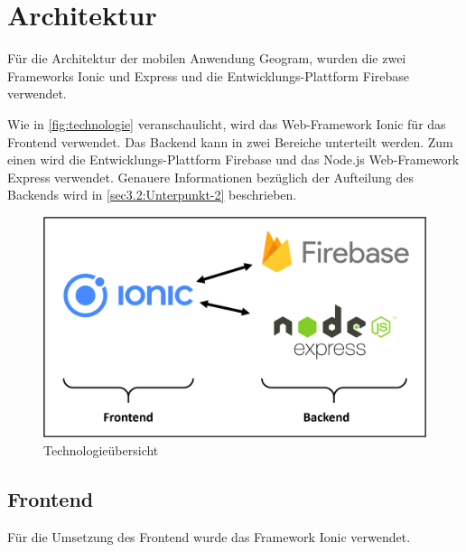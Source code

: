 \chapter{Architektur\label{chap3:Drittes-Kapitel}}

Für die Architektur der mobilen Anwendung \glqq Geogram\grqq{}, wurden die zwei Frameworks \glqq Ionic\grqq{} und \glqq Express\grqq{} und die Entwicklungs-Plattform \glqq Firebase\grqq{} verwendet.

Wie in \autoref{fig:technologie} veranschaulicht, wird das Web-Framework \glqq Ionic\grqq{} für das Frontend verwendet. Das Backend kann in zwei Bereiche unterteilt werden. Zum einen wird die Entwicklungs-Plattform \glqq Firebase\grqq{} und das Node.js Web-Framework \glqq Express\grqq{} verwendet. Genauere Informationen bezüglich der Aufteilung des Backends wird in \autoref{sec3.2:Unterpunkt-2} beschrieben.

\begin{figure}[H]
    \centering
    \includegraphics[width=.8\linewidth]{images/Architektur.png}
    \caption{Technologieübersicht}
    \label{fig:technologie}
\end{figure}

\section{Frontend\label{sec3.1:Unterpunkt-1}}

Für die Umsetzung des Frontend wurde das Framework \glqq Ionic\grqq{} verwendet.



